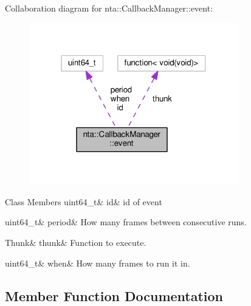 Collaboration diagram for nta\+:\+:Callback\+Manager\+:\+:event\+:
\nopagebreak
\begin{figure}[H]
\begin{center}
\leavevmode
\includegraphics[width=258pt]{da/d01/structnta_1_1CallbackManager_1_1event__coll__graph}
\end{center}
\end{figure}
\begin{DoxyFields}{Class Members}
\mbox{\label{classnta_1_1CallbackManager_a743978e02001b9ceff1145c41214d2e5}} 
uint64\_t&
id&
id of event \\
\hline

\mbox{\label{classnta_1_1CallbackManager_a15dd99ac7d4588c5ac5518c063431ef5}} 
uint64\_t&
period&
How many frames between consecutive runs. \\
\hline

\mbox{\label{classnta_1_1CallbackManager_ad92bce3b5cee6411a2b2c08b4c13b767}} 
Thunk&
thunk&
Function to execute. \\
\hline

\mbox{\label{classnta_1_1CallbackManager_ab20a0382304629ebdc2643a834c9dcff}} 
uint64\_t&
when&
How many frames to run it in. \\
\hline

\end{DoxyFields}


\subsection{Member Function Documentation}
\mbox{\label{classnta_1_1CallbackManager_a7912dc908d7a7a44267ddd8fa6fb8686}} 
